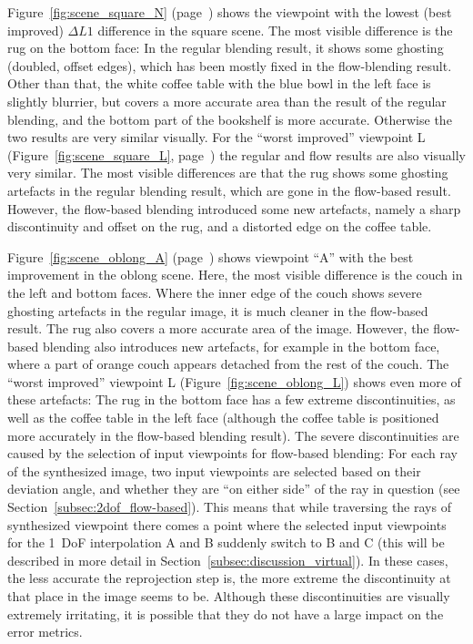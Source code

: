 Figure~\ref{fig:scene_square_N} (page~\pageref{fig:scene_square_N}) shows the viewpoint with the lowest (best improved) $\Delta L1$ difference in the square scene. The most visible difference is the rug on the bottom face: In the regular blending result, it shows some ghosting (doubled, offset edges), which has been mostly fixed in the flow-blending result. Other than that, the white coffee table with the blue bowl in the left face is slightly blurrier, but covers a more accurate area than the result of the regular blending, and the bottom part of the bookshelf is more accurate. Otherwise the two results are very similar visually.
For the ``worst improved'' viewpoint L (Figure~\ref{fig:scene_square_L}, page~\pageref{fig:scene_square_L}) the regular and flow results are also visually very similar. The most visible differences are that the rug shows some ghosting artefacts in the regular blending result, which are gone in the flow-based result. However, the flow-based blending introduced some new artefacts, namely a sharp discontinuity and offset on the rug, and a distorted edge on the coffee table.

Figure~\ref{fig:scene_oblong_A} (page~\pageref{fig:scene_oblong_A}) shows viewpoint ``A'' with the best improvement in the oblong scene. Here, the most visible difference is the couch in the left and bottom faces. Where the inner edge of the couch shows severe ghosting artefacts in the regular image, it is much cleaner in the flow-based result. The rug also covers a more accurate area of the image. However, the flow-based blending also introduces new artefacts, for example in the bottom face, where a part of orange couch appears detached from the rest of the couch.
The ``worst improved'' viewpoint L (Figure~\ref{fig:scene_oblong_L}) shows even more of these artefacts: The rug in the bottom face has a few extreme discontinuities, as well as the coffee table in the left face (although the coffee table is positioned more accurately in the flow-based blending result). The severe discontinuities are caused by the selection of input viewpoints for flow-based blending: For each ray of the synthesized image, two input viewpoints are selected based on their deviation angle, and whether they are ``on either side'' of the ray in question (see Section~\ref{subsec:2dof_flow-based}). This means that while traversing the rays of synthesized viewpoint there comes a point where the selected input viewpoints for the 1~DoF interpolation A and B suddenly switch to B and C (this will be described in more detail in Section~\ref{subsec:discussion_virtual}). In these cases, the less accurate the reprojection step is, the more extreme the discontinuity at that place in the image seems to be. Although these discontinuities are visually extremely irritating, it is possible that they do not have a large impact on the error metrics.

